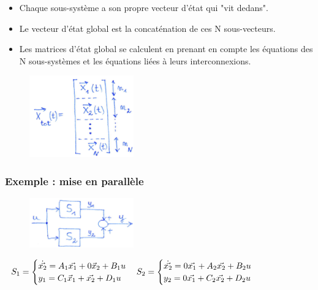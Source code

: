 \documentclass[document.tex]{subfiles}
\begin{document}
\begin{itemize}
 \item Chaque sous-système a son propre vecteur d'état qui "vit dedans".
 \item Le vecteur d'état global est la concaténation de ces N sous-vecteurs.
 \item Les matrices d'état global se calculent en prenant en compte les équations des N sous-systèmes et les équations liées à leurs interconnexions.
\end{itemize}

\begin{figure}[H]
    \centering
    \includegraphics[width=0.4\textwidth]{Include/Figure/24.png}
\end{figure}

\subsubsection{Exemple : mise en parallèle}

\begin{figure}[H]
    \centering
    \includegraphics[width=0.4\textwidth]{Include/Figure/25.png}
\end{figure}


$
\begin{array}{l l}
S_1 = \begin{cases}
		\dot{\vec{x_2}} = A_1\vec{x_1} + 0\vec{x}_2 + B_1 u \\
	y_1 = C_1\vec{x}_1 + \vec{x_2} + D_1 u
\end{cases}

S_2 = \begin{cases}
\dot{\vec{x_2}} = 0\vec{x_1} + A_2\vec{x_2} + B_2 u \\
	y_2 = 0\vec{x_1} + C_2\vec{x_2} + D_2 u
\end{cases}  
\end{array}
$
\\[12pt]
\end{document}
